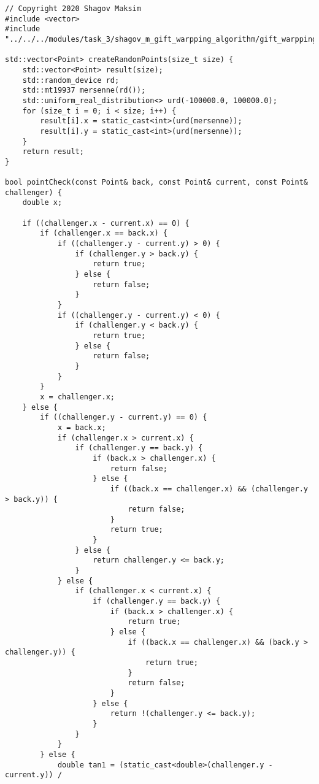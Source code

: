 \documentclass{report}
\begin{document}
\begin{lstlisting}
// Copyright 2020 Shagov Maksim
#include <vector>
#include "../../../modules/task_3/shagov_m_gift_warpping_algorithm/gift_warpping_algorithm.h"

std::vector<Point> createRandomPoints(size_t size) {
    std::vector<Point> result(size);
    std::random_device rd;
    std::mt19937 mersenne(rd());
    std::uniform_real_distribution<> urd(-100000.0, 100000.0);
    for (size_t i = 0; i < size; i++) {
        result[i].x = static_cast<int>(urd(mersenne));
        result[i].y = static_cast<int>(urd(mersenne));
    }
    return result;
}

bool pointCheck(const Point& back, const Point& current, const Point& challenger) {
    double x;

    if ((challenger.x - current.x) == 0) {
        if (challenger.x == back.x) {
            if ((challenger.y - current.y) > 0) {
                if (challenger.y > back.y) {
                    return true;
                } else {
                    return false;
                }
            }
            if ((challenger.y - current.y) < 0) {
                if (challenger.y < back.y) {
                    return true;
                } else {
                    return false;
                }
            }
        }
        x = challenger.x;
    } else {
        if ((challenger.y - current.y) == 0) {
            x = back.x;
            if (challenger.x > current.x) {
                if (challenger.y == back.y) {
                    if (back.x > challenger.x) {
                        return false;
                    } else {
                        if ((back.x == challenger.x) && (challenger.y > back.y)) {
                            return false;
                        }
                        return true;
                    }
                } else {
                    return challenger.y <= back.y;
                }
            } else {
                if (challenger.x < current.x) {
                    if (challenger.y == back.y) {
                        if (back.x > challenger.x) {
                            return true;
                        } else {
                            if ((back.x == challenger.x) && (back.y > challenger.y)) {
                                return true;
                            }
                            return false;
                        }
                    } else {
                        return !(challenger.y <= back.y);
                    }
                }
            }
        } else {
            double tan1 = (static_cast<double>(challenger.y - current.y)) /

\end{lstlisting}
\end{document}
